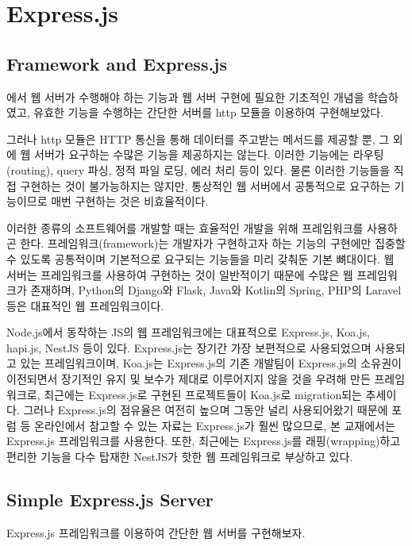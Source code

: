 \section{Express.js}\label{sect:express-js}

\subsection*{Framework and Express.js}

에서 웹 서버가 수행해야 하는 기능과 웹 서버 구현에 필요한 기초적인 개념을 학습하였고, 유효한 기능을 수행하는 간단한 서버를 http 모듈을 이용하여 구현해보았다.

그러나 http 모듈은 HTTP 통신을 통해 데이터를 주고받는 메서드를 제공할 뿐, 그 외에 웹 서버가 요구하는 수많은 기능을 제공하지는 않는다. 이러한 기능에는 라우팅(routing), query 파싱, 정적 파일 로딩, 에러 처리 등이 있다. 물론 이러한 기능들을 직접 구현하는 것이 불가능하지는 않지만, 통상적인 웹 서버에서 공통적으로 요구하는 기능이므로 매번 구현하는 것은 비효율적이다.

이러한 종류의 소프트웨어를 개발할 때는 효율적인 개발을 위해 프레임워크를 사용하곤 한다. 프레임워크(framework)는 개발자가 구현하고자 하는 기능의 구현에만 집중할 수 있도록 공통적이며 기본적으로 요구되는 기능들을 미리 갖춰둔 기본 뼈대이다. 웹 서버는 프레임워크를 사용하여 구현하는 것이 일반적이기 때문에 수많은 웹 프레임워크가 존재하며, Python의 Django와 Flask, Java와 Kotlin의 Spring, PHP의 Laravel 등은 대표적인 웹 프레임워크이다.

Node.js에서 동작하는 JS의 웹 프레임워크에는 대표적으로 Express.js, Koa.js, hapi.js, NestJS 등이 있다. Express.js는 장기간 가장 보편적으로 사용되었으며 사용되고 있는 프레임워크이며, Koa.js는 Express.js의 기존 개발팀이 Express.js의 소유권이 이전되면서 장기적인 유지 및 보수가 제대로 이루어지지 않을 것을 우려해 만든 프레임워크로, 최근에는 Express.js로 구현된 프로젝트들이 Koa.js로 migration되는 추세이다. 그러나 Express.js의 점유율은 여전히 높으며 그동안 널리 사용되어왔기 때문에 포럼 등 온라인에서 참고할 수 있는 자료는 Express.js가 훨씬 많으므로, 본 교재에서는 Express.js 프레임워크를 사용한다. 또한, 최근에는 Express.js를 래핑(wrapping)하고 편리한 기능을 다수 탑재한 NestJS가 핫한 웹 프레임워크로 부상하고 있다.

\subsection*{Simple Express.js Server}

Express.js 프레임워크를 이용하여 간단한 웹 서버를 구현해보자.

